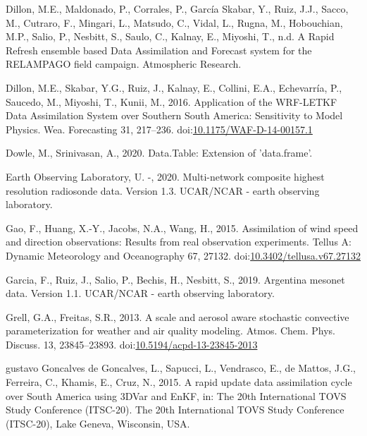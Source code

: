 \documentclass[final,5p,times,twocolumn,authoryear]{elsarticle} %
\begin{document}
\leavevmode\hypertarget{ref-dillonInreview}{}%
Dillon, M.E., Maldonado, P., Corrales, P., García Skabar, Y., Ruiz, J.J., Sacco, M., Cutraro, F., Mingari, L., Matsudo, C., Vidal, L., Rugna, M., Hobouchian, M.P., Salio, P., Nesbitt, S., Saulo, C., Kalnay, E., Miyoshi, T., n.d. A Rapid Refresh ensemble based Data Assimilation and Forecast system for the RELAMPAGO field campaign. Atmospheric Research.

\leavevmode\hypertarget{ref-dillon2016}{}%
Dillon, M.E., Skabar, Y.G., Ruiz, J., Kalnay, E., Collini, E.A., Echevarría, P., Saucedo, M., Miyoshi, T., Kunii, M., 2016. Application of the WRF-LETKF Data Assimilation System over Southern South America: Sensitivity to Model Physics. Wea. Forecasting 31, 217--236. doi:\href{https://doi.org/10.1175/WAF-D-14-00157.1}{10.1175/WAF-D-14-00157.1}

\leavevmode\hypertarget{ref-dowle2020}{}%
Dowle, M., Srinivasan, A., 2020. Data.Table: Extension of 'data.frame'.

\leavevmode\hypertarget{ref-sondeos}{}%
Earth Observing Laboratory, U. -, 2020. Multi-network composite highest resolution radiosonde data. Version 1.3. UCAR/NCAR - earth observing laboratory.

\leavevmode\hypertarget{ref-gao2015}{}%
Gao, F., Huang, X.-Y., Jacobs, N.A., Wang, H., 2015. Assimilation of wind speed and direction observations: Results from real observation experiments. Tellus A: Dynamic Meteorology and Oceanography 67, 27132. doi:\href{https://doi.org/10.3402/tellusa.v67.27132}{10.3402/tellusa.v67.27132}

\leavevmode\hypertarget{ref-garcia2019}{}%
Garcia, F., Ruiz, J., Salio, P., Bechis, H., Nesbitt, S., 2019. Argentina mesonet data. Version 1.1. UCAR/NCAR - earth observing laboratory.

\leavevmode\hypertarget{ref-grell2013}{}%
Grell, G.A., Freitas, S.R., 2013. A scale and aerosol aware stochastic convective parameterization for weather and air quality modeling. Atmos. Chem. Phys. Discuss. 13, 23845--23893. doi:\href{https://doi.org/10.5194/acpd-13-23845-2013}{10.5194/acpd-13-23845-2013}

\leavevmode\hypertarget{ref-goncalvesdegoncalves2015}{}%
gustavo Goncalves de Goncalves, L., Sapucci, L., Vendrasco, E., de Mattos, J.G., Ferreira, C., Khamis, E., Cruz, N., 2015. A rapid update data assimilation cycle over South America using 3DVar and EnKF, in: The 20th International TOVS Study Conference (ITSC-20). The 20th International TOVS Study Conference (ITSC-20), Lake Geneva, Wisconsin, USA.
\end{document}
